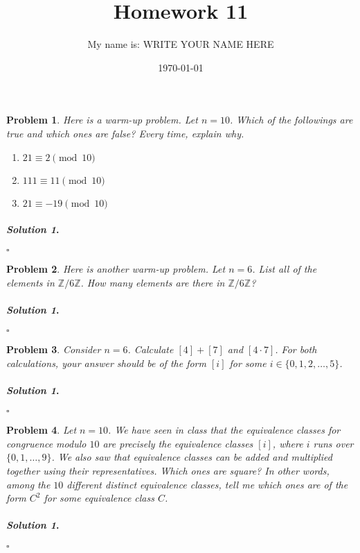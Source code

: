 \documentclass{amsart}
\theoremstyle{plain}
\newtheorem{problem}{Problem}
\newenvironment{solution}{\paragraph{\emph{Solution 1}.}}{\hfill$\square$}
\begin{document}
 

\title[Homework 11]{Homework 11}
\author{My name is:  WRITE YOUR NAME HERE}  %
\date{\today} 
\maketitle 

\begin{problem}
Here is a warm-up problem.  Let $n = 10$.  Which of the followings are true and which ones are false?  Every time, explain why.
\begin{enumerate}
\item $21 \equiv 2 \pmod{10}$
\item $111 \equiv 11 \pmod{10}$
\item $21 \equiv -19 \pmod{10}$
\end{enumerate}
\end{problem}
\begin{solution}
\end{solution}

\begin{problem}
Here is another warm-up problem.  Let $n = 6$.  List all of the elements in $\mathbb{Z}/6\mathbb{Z}$.  How many elements are there in $\mathbb{Z}/6\mathbb{Z}$?
\end{problem}
\begin{solution}
\end{solution}

\begin{problem}
Consider $n = 6$.  Calculate $[4] + [7]$ and $[4 \cdot 7]$.  For both calculations, your answer should be of the form $[i]$ for some $i \in \{0,1,2,\ldots,5 \}$.
\end{problem}
\begin{solution}
\end{solution}

\begin{problem}
Let $n = 10$.  We have seen in class that the equivalence classes for congruence modulo $10$ are precisely the equivalence classes $[i]$, where $i$ runs over $\{0,1,\ldots,9 \}$.  We also saw that equivalence classes can be added and multiplied together using their representatives.  Which ones are square?  In other words, among the $10$ different distinct equivalence classes, tell me which ones are of the form $C^{2}$ for some equivalence class $C$.  
\end{problem}
\begin{solution}
\end{solution}
\end{document}

